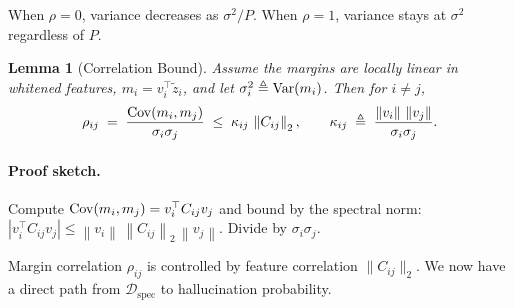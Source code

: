 \documentclass{article} %
\newtheorem{lemma}{Lemma}
\newtheorem{proposition}{Proposition}
\newcommand{\Prob}{\mathbb{P}}
\newcommand{\norm}[1]{\left\lVert #1 \right\rVert}
\begin{document}
When $\rho = 0$, variance decreases as $\sigma^2/P$. When $\rho = 1$, variance stays at $\sigma^2$ regardless of $P$.




\begin{lemma}[Correlation Bound]
  \label{lem:corr-bound}
  Assume the margins are locally linear in whitened features,
  $m_i = v_i^\top \tilde z_i$, and let $\sigma_i^2\triangleq \mathrm{Var}(m_i)$.
  Then for $i\neq j$,
  \begin{equation}
    \rho_{ij}
    \;=\; \frac{\Cov(m_i,m_j)}{\sigma_i\sigma_j}
    \;\le\; \kappa_{ij}\,\norm{C_{ij}}_2,
    \qquad
    \kappa_{ij}\;\triangleq\; \frac{\norm{v_i}\,\norm{v_j}}{\sigma_i\sigma_j}.
  \end{equation}
\end{lemma}

\paragraph{Proof sketch.}
Compute $\mathrm{Cov}(m_i,m_j)=v_i^\top C_{ij}v_j$ and bound by the spectral norm: $|v_i^\top C_{ij}v_j|\le
\norm{v_i}\,\norm{C_{ij}}_2\,\norm{v_j}$. Divide by $\sigma_i\sigma_j$.

Margin correlation $\rho_{ij}$ is controlled by feature correlation $\|C_{ij}\|_2$. We now have a direct path
from $\mathcal{D}_{\mathrm{spec}}$ to hallucination probability.
\end{document}
